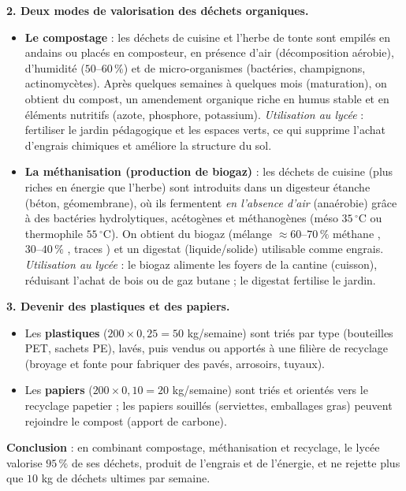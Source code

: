 \documentclass[11pt]{article}
\newcommand{\cle}[1]{{\popxbold\color{popdark}#1}}
\begin{document}
\begin{exoresolu}
\textbf{2. Deux modes de valorisation des déchets organiques.}
\begin{itemize}
\item \textbf{Le compostage} : les déchets de cuisine et l'herbe de tonte sont empilés en andains ou placés en composteur, en présence d'\cle{air} (décomposition aérobie), d'humidité ($50\text{--}60\,\%$) et de micro-organismes (bactéries, champignons, actinomycètes). Après quelques semaines à quelques mois (maturation), on obtient du \cle{compost}, un amendement organique riche en humus stable et en éléments nutritifs (azote, phosphore, potassium). \emph{Utilisation au lycée} : fertiliser le jardin pédagogique et les espaces verts, ce qui supprime l'achat d'engrais chimiques et améliore la structure du sol.
\item \textbf{La méthanisation (production de biogaz)} : les déchets de cuisine (plus riches en énergie que l'herbe) sont introduits dans un \cle{digesteur} étanche (béton, géomembrane), où ils fermentent \emph{en l'absence d'air} (anaérobie) grâce à des bactéries hydrolytiques, acétogènes et méthanogènes (méso $35\,^\circ\mathrm{C}$ ou thermophile $55\,^\circ\mathrm{C}$). On obtient du \cle{biogaz} (mélange $\approx 60\text{--}70\,\%$ méthane , $30\text{--}40\,\%$ , traces ) et un \cle{digestat} (liquide/solide) utilisable comme engrais. \emph{Utilisation au lycée} : le biogaz alimente les foyers de la cantine (cuisson), réduisant l'achat de bois ou de gaz butane ; le digestat fertilise le jardin.
\end{itemize}
\textbf{3. Devenir des plastiques et des papiers.}
\begin{itemize}
\item Les \textbf{plastiques} ($200 \times 0{,}25 = 50$ kg/semaine) sont triés par type (bouteilles PET, sachets PE), lavés, puis vendus ou apportés à une filière de \cle{recyclage} (broyage et fonte pour fabriquer des pavés, arrosoirs, tuyaux).
\item Les \textbf{papiers} ($200 \times 0{,}10 = 20$ kg/semaine) sont triés et orientés vers le recyclage papetier ; les papiers souillés (serviettes, emballages gras) peuvent rejoindre le compost (apport de carbone).
\end{itemize}
\textbf{Conclusion} : en combinant compostage, méthanisation et recyclage, le lycée valorise $95\,\%$ de ses déchets, produit de l'engrais et de l'énergie, et ne rejette plus que $10$ kg de déchets ultimes par semaine.
\end{exoresolu}
\end{document}
